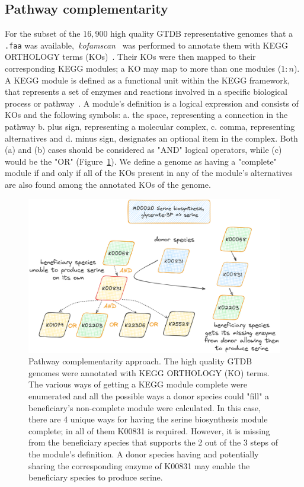 \documentclass[sn-mathphys,Numbered, lineno]{sn-jnl}  %
\theoremstyle{thmstyleone}%
\theoremstyle{thmstyletwo}%
\theoremstyle{thmstylethree}%
\begin{document}
    \subsection*{ Pathway complementarity }
    \label{subsec:path-compl}

        For the subset of the $16,900$ high quality GTDB representative genomes that a \texttt{.faa} was available,~\textit{kofamscan}~\cite{aramaki2020kofamkoala} was performed to annotate them with KEGG ORTHOLOGY terms (KOs)~\cite{kanehisa2012kegg}. 
        Their KOs were then mapped to their corresponding KEGG modules; a KO may map to more than one modules ($1:n$).
        A KEGG module is defined as a functional unit within the KEGG framework, that represents a set of enzymes and reactions involved in a specific biological process or pathway~\cite{muto2013modular}.
        A module's definition is a logical expression and consists of KOs and the following symbols:
            a. the space, representing a connection in the pathway
            b. plus sign, representing a molecular complex,  
            c. comma, representing alternatives and
            d. minus sign, designates an optional item in the complex.
        Both (a) and (b) cases should be considered as "AND" logical operators, while (c) would be the "OR" 
        (Figure~\ref{fig:pathcompl}).
        We define a genome as having a "complete" module if and only if all of the KOs present in any of the module's alternatives are also found among the annotated KOs of the genome.

        \begin{figure}[h!]
            \includegraphics*[width=0.8\columnwidth]{figs/path_complem.png}
            \caption{
                Pathway complementarity approach. 
                The high quality GTDB genomes were annotated with KEGG ORTHOLOGY (KO) terms.
                The various ways of getting a KEGG module complete were enumerated and all the possible ways a donor species could "fill" a beneficiary's non-complete module were calculated.
                In this case, there are 4 unique ways for having the serine biosynthesis module complete; in all of them K00831 is required.
                However, it is missing from the beneficiary species that supports the 2 out of the 3 steps of the module's definition.
                A donor species having and potentially sharing the corresponding enzyme of K00831 may enable the beneficiary species to produce serine.
            }
            \label{fig:pathcompl}
        \end{figure}
\end{document}
